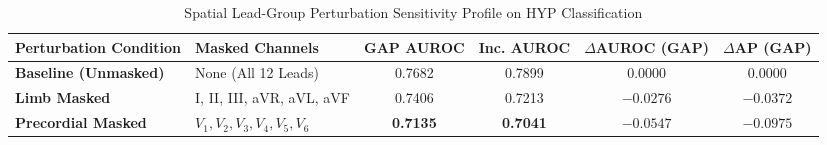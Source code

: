 \begin{table}[t]
\begin{subtable}{\textwidth}
\centering
\caption{Spatial Lead-Group Perturbation Sensitivity Profile on HYP Classification}
\begin{tabular}{llcccc}
\toprule
\textbf{Perturbation Condition} & \textbf{Masked Channels} & \textbf{GAP AUROC} & \textbf{Inc. AUROC} & \textbf{$\Delta$AUROC (GAP)} & \textbf{$\Delta$AP (GAP)} \\
\midrule
\textbf{Baseline (Unmasked)} & None (All 12 Leads) & 0.7682 & 0.7899 & 0.0000 & 0.0000 \\
\textbf{Limb Masked} & I, II, III, aVR, aVL, aVF & 0.7406 & 0.7213 & $-0.0276$ & $-0.0372$ \\
\textbf{Precordial Masked} & $V_1, V_2, V_3, V_4, V_5, V_6$ & \textbf{0.7135} & \textbf{0.7041} & \textbf{$-0.0547$} & \textbf{$-0.0975$} \\
\bottomrule
\end{tabular}
\end{subtable}
\end{table}
